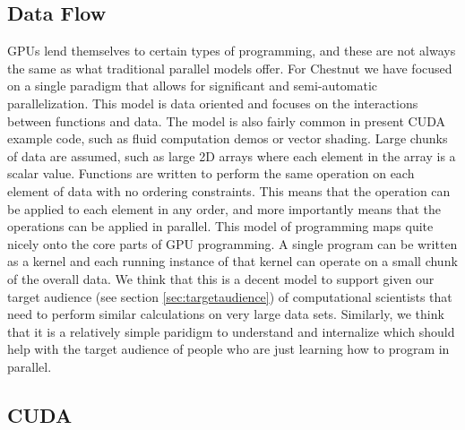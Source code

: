 \documentclass[twocolumn]{article}
\renewcommand{\|}{\origbar} %
\begin{document}
\subsection{Data Flow}

GPUs lend themselves to certain types of programming, and these are not always the same as what traditional parallel models offer. For Chestnut we have focused on a single paradigm that allows for significant and semi-automatic parallelization. This model is data oriented and focuses on the interactions between functions and data. The model is also fairly common in present CUDA example code, such as fluid computation demos or vector shading. Large chunks of data are assumed, such as large 2D arrays where each element in the array is a scalar value. Functions are written to perform the same operation on each element of data with no ordering constraints. This means that the operation can be applied to each element in any order, and more importantly means that the operations can be applied in parallel. This model of programming maps quite nicely onto the core parts of GPU programming. A single program can be written as a kernel and each running instance of that kernel can operate on a small chunk of the overall data. We think that this is a decent model to support given our target audience (see section \ref{sec:targetaudience}) of computational scientists that need to perform similar calculations on very large data sets. Similarly, we think that it is a relatively simple paridigm to understand and internalize which should help with the target audience of people who are just learning how to program in parallel.

\subsection{CUDA}
\label{sec:CUDA}
\end{document}

